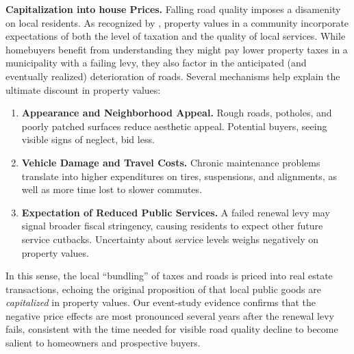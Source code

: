 {\bf Capitalization into house Prices.} Falling road quality imposes a disamenity on local residents. As recognized by \cite{Oates1969}, property values in a community incorporate expectations of both the level of taxation and the quality of local services. While homebuyers benefit from understanding they might pay lower property taxes in a municipality with a failing levy, they also factor in the anticipated (and eventually realized) deterioration of roads. Several mechanisms help explain the ultimate discount in property values:

\begin{enumerate}
    \item \textbf{Appearance and Neighborhood Appeal.} Rough roads, potholes, and poorly patched surfaces reduce aesthetic appeal. Potential buyers, seeing visible signs of neglect, bid less.
    \item \textbf{Vehicle Damage and Travel Costs.} Chronic maintenance problems translate into higher expenditures on tires, suspensions, and alignments, as well as more time lost to slower commutes.
    \item \textbf{Expectation of Reduced Public Services.} A failed renewal levy may signal broader fiscal stringency, causing residents to expect other future service cutbacks. Uncertainty about service levels weighs negatively on property values. 
\end{enumerate}

\noindent In this sense, the local “bundling” of taxes and roads is priced into real estate transactions, echoing the original proposition of \cite{Tiebout1956} that local public goods are \emph{capitalized} in property values. Our event-study evidence confirms that the negative price effects are most pronounced several years after the renewal levy fails, consistent with the time needed for visible road quality decline to become salient to homeowners and prospective buyers.

